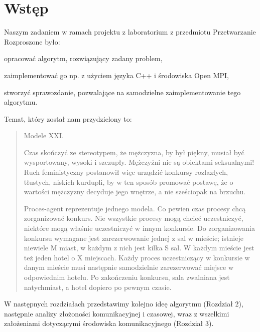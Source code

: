 \documentclass{article}
\begin{document}



\section{Wstęp}


Naszym zadaniem w ramach projektu z laboratorium z przedmiotu Przetwarzanie Rozproszone było:

\begin{tightlist}
\item opracować algorytm, rozwiązujący zadany problem,
\item zaimplementować go np. z użyciem języka C++ i środowiska Open MPI,
\item stworzyć sprawozdanie, pozwalające na samodzielne zaimplementowanie tego algorytmu.
\end{tightlist}

Temat, który został nam przydzielony to:
\begin{quote}
\begin{large}
\begin{center}
Modele XXL
\end{center}
\end{large}

 Czas skończyć ze stereotypem, że mężczyzna, by był piękny, musiał być wysportowany, wysoki i szczupły. Mężczyźni nie są obiektami seksualnymi! Ruch feministyczny postanowił więc urządzić konkursy rozlazłych, tłustych, niskich kurdupli, by w ten sposób promować postawę, że o wartości mężczyzny decyduje jego wnętrze, a nie sześciopak na brzuchu.

Proces-agent reprezentuje jednego modela. Co pewien czas procesy chcą zorganizować konkurs. Nie wszystkie procesy mogą chcieć uczestniczyć, niektóre mogą właśnie uczestniczyć w innym konkursie. Do zorganizowania konkursu wymagane jest zarezerwowanie jednej z sal w mieście; istnieje niewiele M miast, w każdym z nich jest kilka S sal. W każdym mieście jest też jeden hotel o X miejscach. Każdy proces uczestniczący w konkursie w danym mieście musi następnie samodzielnie zarezerwować miejsce w odpowiednim hotelu. Po zakończeniu konkursu, sala zwalniana jest natychmiast, a hotel dopiero po pewnym czasie. 
\end{quote}

W następnych rozdziałach przedstawimy kolejno ideę algorytmu (Rozdział 2), następnie analizy złożoności komunikacyjnej i czasowej, wraz z wszelkimi założeniami dotyczącymi środowiska komunikacyjnego (Rozdział 3). 
\end{document}
